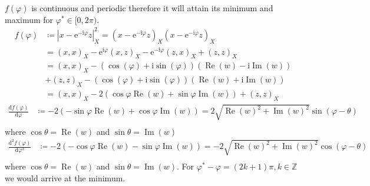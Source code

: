 		\begin{Proof}
			$f(\varphi)$ is continuous and periodic therefore it will attain its minimum and maximum for $\varphi^\ast \in [0,2\pi)$\cite{Rudin1976}\cite{Rudin1987}.
			\begin{equation*}
				\begin{split}
				f(\varphi) &\coloneqq \left|x-\mathrm{e}^{-\mathrm{i}\varphi}z\right|^2_X = 
				\left(x-\mathrm{e}^{-\mathrm{i}\varphi}z\right)_X\left(x-\mathrm{e}^{-\mathrm{i}\varphi}z\right)_X\\
						   &= \left(x,x\right)_X - \mathrm{e}^{\mathrm{i}\varphi}\left(x,z\right)_X-\mathrm{e}^{-\mathrm{i}\varphi}\left(z,x\right)_X+\left(z,z\right)_X \\
                		   &= \left(x,x\right)_X - (\cos(\varphi)+\mathrm{i}\sin(\varphi))\left(\operatorname{Re}(w) -\mathrm{i}\operatorname{Im}(w)\right)\\
						   &+ \left(z,z\right)_X - (\cos(\varphi)+\mathrm{i}\sin(\varphi))\left(\operatorname{Re}(w) +\mathrm{i}\operatorname{Im}(w)\right)\\
						   &= \left(x,x\right)_X - 2\left(\cos\varphi\operatorname{Re}(w)+\sin\varphi\operatorname{Im}(w)\right)+ \left(z,z\right)_X
				\end{split}
			  \end{equation*}
			  \begin{equation*}
				\begin{split}
				\frac{\mathrm{d}f(\varphi)}{\mathrm{d}\varphi} &\coloneqq - 2\left(-\sin\varphi\operatorname{Re}(w)+\cos\varphi\operatorname{Im}(w)\right) = 2\sqrt{\operatorname{Re}(w)^2+\operatorname{Im}(w)^2}\sin(\varphi-\theta)\\ 
				\end{split}
			  \end{equation*}
			  where $\cos\theta = \operatorname{Re}(w)$ and $\sin\theta = \operatorname{Im}(w)$
			  \begin{equation*}
				\begin{split}
				\frac{\mathrm{d}^2f(\varphi)}{\mathrm{d}\varphi^2} &\coloneqq - 2\left(-\cos\varphi\operatorname{Re}(w)-\sin\varphi\operatorname{Im}(w)\right) = -2\sqrt{\operatorname{Re}(w)^2+\operatorname{Im}(w)^2}\cos(\varphi-\theta)\\ 
				\end{split}
			  \end{equation*}
			  where $\cos\theta = \operatorname{Re}(w)$ and $\sin\theta = \operatorname{Im}(w)$.
			  For $\varphi^\ast-\varphi = (2k+1)\pi, k \in \mathbb{Z}$ we would arrive at the minimum.

		\end{Proof}

